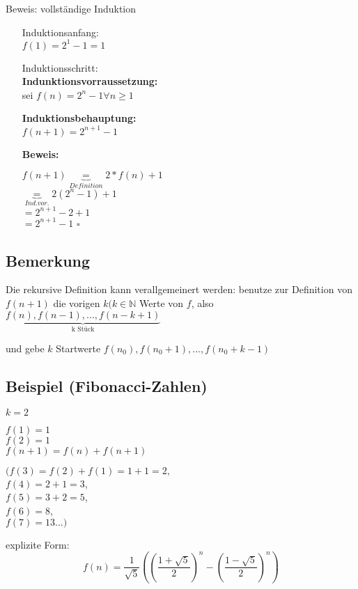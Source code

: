 \documentclass[a4paper, 12pt, twoside] {article}
\begin{document}
\begin{description}
Beweis: vollständige Induktion

\begin{itemize}
\item[Induktionsanfang:] \hfill \\
$f(1) = 2^1 -1 = 1$

\item[Induktionsschritt:] \hfill \\
\textbf{Indunktionsvorraussetzung:} \\
sei $f(n) = 2^n - 1 \forall n \geq 1$

\textbf{Induktionsbehauptung:} \\
$f(n+1) = 2^{n+1} -1$

\textbf{Beweis:}

$f(n+1) \underbrace{=}_{Definition} 2*f(n) + 1$ \\
$\underbrace{=}_{Ind. vor.} 2 (2^n -1) +1$ \\
$= 2^{n+1} - 2 + 1$ \\
$= 2^{n+1} - 1$ \hfill $\square$

\end{itemize}

\end{description}

\subsection{Bemerkung}
Die rekursive Definition kann verallgemeinert werden: benutze zur Definition von $f(n+1)$ die vorigen $k(k \in \mathbb{N}$ Werte von $f$, also $\underbrace{f(n), f(n-1), ..., f(n-k+1)}_{\text{k Stück}}$

und gebe $k$ Startwerte $f(n_0), f(n_0 + 1), ..., f(n_0 + k - 1)$

\subsection{Beispiel (Fibonacci-Zahlen)}
$k = 2$

$f(1) = 1$ \\
$f(2) = 1$ \\
$f(n+1) = f(n) + f(n+1)$

$(f(3) = f(2) + f(1) = 1 + 1 = 2,$ \\
$f(4) = 2 + 1 = 3$, \\
$f(5) = 3 + 2 = 5$, \\
$f(6) = 8$, \\
$f(7) = 13...)$

explizite Form:
$$f(n) = \frac{1}{\sqrt{5}} (( \frac{1 + \sqrt{5}}{2})^n - (\frac{1- \sqrt{5}}{2})^n)$$
\end{document}
